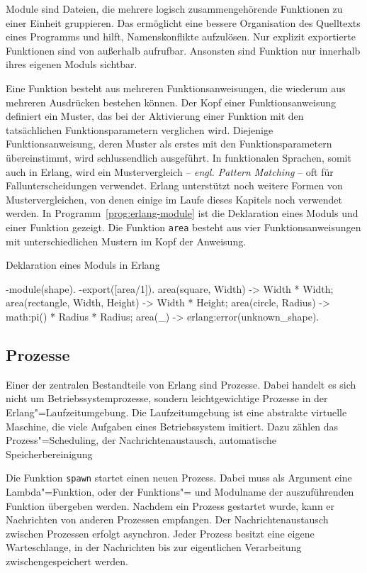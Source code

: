 Module sind Dateien, die mehrere logisch zusammengehörende Funktionen zu einer Einheit gruppieren. Das ermöglicht eine bessere Organisation des Quelltexts eines Programms und hilft, Namenskonflikte aufzulösen. Nur explizit exportierte Funktionen sind von außerhalb aufrufbar. Ansonsten sind Funktion nur innerhalb ihres eigenen Moduls sichtbar.

Eine Funktion besteht aus mehreren Funktionsanweisungen, die wiederum aus mehreren Ausdrücken bestehen können. Der Kopf einer Funktionsanweisung definiert ein Muster, das bei der Aktivierung einer Funktion mit den tatsächlichen Funktionsparametern verglichen wird. Diejenige Funktionsanweisung, deren Muster als erstes mit den Funktionsparametern übereinstimmt, wird schlussendlich ausgeführt. In funktionalen Sprachen, somit auch in Erlang, wird ein Mustervergleich -- \textit{engl. Pattern Matching} -- oft für Fallunterscheidungen verwendet. Erlang unterstützt noch weitere Formen von Mustervergleichen, von denen einige im Laufe dieses Kapitels noch verwendet werden. In Programm~\ref{prog:erlang-module} ist die Deklaration eines Moduls und einer Funktion gezeigt. Die Funktion \lstinline{area} besteht aus vier Funktionsanweisungen mit unterschiedlichen Mustern im Kopf der Anweisung.

\begin{program}[!hbt]
\caption{Deklaration eines Moduls in Erlang}
\label{prog:erlang-module}
\begin{ErlangCode}
-module(shape).
-export([area/1]).
area({square, Width}) -> Width * Width;
area({rectangle, Width, Height}) -> Width * Height;
area({circle, Radius}) -> math:pi() * Radius * Radius;
area(_) -> erlang:error(unknown_shape).
\end{ErlangCode}
\end{program}

\subsection{Prozesse}
\label{subsec:erlang-processes}

Einer der zentralen Bestandteile von Erlang sind Prozesse. Dabei handelt es sich nicht um Betriebssystemprozesse, sondern leichtgewichtige Prozesse in der Erlang"=Laufzeitumgebung. Die Laufzeitumgebung ist eine abstrakte virtuelle Maschine, die viele Aufgaben eines Betriebssystem imitiert. Dazu zählen das Prozess"=Scheduling, der Nachrichtenaustausch, automatische Speicherbereinigung \usw

Die Funktion \lstinline{spawn} startet einen neuen Prozess. Dabei muss als Argument eine Lambda"=Funktion, oder der Funktions"= und Modulname der auszuführenden Funktion übergeben werden. Nachdem ein Prozess gestartet wurde, kann er Nachrichten von anderen Prozessen empfangen. Der Nachrichtenaustausch zwischen Prozessen erfolgt asynchron. Jeder Prozess besitzt eine eigene Warteschlange, in der Nachrichten bis zur eigentlichen Verarbeitung zwischengespeichert werden.


